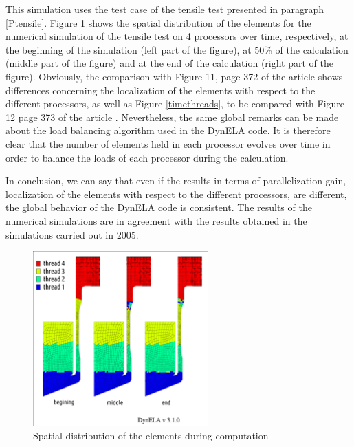 This simulation uses the test case of the tensile test presented in paragraph \ref{Ptensile}. Figure \ref{spacethreads} shows the spatial distribution of the elements for the numerical simulation of the tensile test on 4 processors over time, respectively, at the beginning of the simulation (left part of the figure), at 50\% of the calculation (middle part of the figure) and at the end of the calculation (right part of the figure). Obviously, the comparison with Figure 11, page 372 of the article \cite{Pantale:2005} shows differences concerning the localization of the elements with respect to the different processors, as well as Figure \ref{timethreads}, to be compared with Figure 12 page 373 of the article \cite{Pantale:2005}. Nevertheless, the same global remarks can be made about the load balancing algorithm used in the DynELA code. It is therefore clear that the number of elements held in each processor evolves over time in order to balance the loads of each processor during the calculation.

In conclusion, we can say that even if the results in terms of parallelization gain, localization of the elements with respect to the different processors, are different, the global behavior of the DynELA code is consistent. The results of the numerical simulations are in agreement with the results obtained in the simulations carried out in 2005.

\begin{figure}[h!] 
  \centering
  \includegraphics[width=0.6\textwidth]{./spacethreads.pdf}
  \caption{Spatial distribution of the elements during computation}
  \label{spacethreads}
\end{figure}

